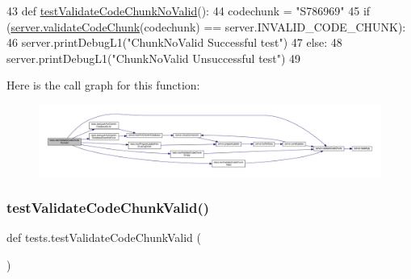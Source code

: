\begin{DoxyCode}
43 \textcolor{keyword}{def }\hyperlink{namespacetests_a625a9a5cd2f728455da250e9ba37d457}{testValidateCodeChunkNoValid}():
44      codechunk = \textcolor{stringliteral}{"S786969"}
45      \textcolor{keywordflow}{if} (\hyperlink{namespaceserver_ad6f5a9a8c8e233d0537dc69dc6de98f6}{server.validateCodeChunk}(codechunk) == server.INVALID\_CODE\_CHUNK):
46           server.printDebugL1(\textcolor{stringliteral}{"ChunkNoValid Successful test"})
47      \textcolor{keywordflow}{else}:
48           server.printDebugL1(\textcolor{stringliteral}{"ChunkNoValid Unsuccessful test"})
49           
\end{DoxyCode}
Here is the call graph for this function\+:
\nopagebreak
\begin{figure}[H]
\begin{center}
\leavevmode
\includegraphics[width=350pt]{namespacetests_a625a9a5cd2f728455da250e9ba37d457_cgraph}
\end{center}
\end{figure}
\mbox{\label{namespacetests_a4d364f808ece8a89192b5fa6bd230906}} 
\subsubsection{\texorpdfstring{test\+Validate\+Code\+Chunk\+Valid()}{testValidateCodeChunkValid()}}
{\footnotesize\ttfamily def tests.\+test\+Validate\+Code\+Chunk\+Valid (\begin{DoxyParamCaption}{ }\end{DoxyParamCaption})}


